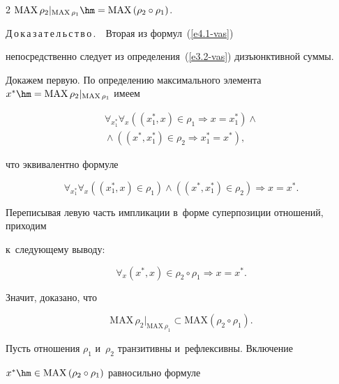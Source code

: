 \begin{multicols}{2}
 $\mathrm{MAX}\,\rho_2\vert_{\mathrm{MAX}\,\rho_1} \hm= \mathrm{MAX} \left(\rho_2\circ\rho_1\right)$.

 

 \smallskip

 

 \noindent

    Д\,о\,к\,а\,з\,а\,т\,е\,л\,ь\,с\,т\,в\,о\,.\ \ Вторая из формул~(\ref{e4.1-vas}) 

непосредственно следует из определения~(\ref{e3.2-vas}) дизъ\-юнк\-тив\-ной суммы. 

Докажем пер\-вую. По определению максимального элемента $x^*\hm= \mathrm{MAX}\,\rho_2\vert_{\mathrm{MAX}\,\rho_1}$ \mbox{имеем}

    \begin{multline*}

    \forall_{x_1^*} \forall_x \left( \left( x_1^*,x\right)\in\rho_1 \Rightarrow 

x=x_1^*\right) \wedge{}\\

{}\wedge  \left(\left( x^*,x_1^*\right)\in\rho_2\Rightarrow x_1^*=x^*\right),

 \end{multline*}

что эквивалентно формуле 

$$

\forall_{x_1^*} \forall_x \left(\left( x_1^*, x\right)\in \rho_1\right) \wedge \left(\left( x^*, 

x_1^*\right)\in \rho_2\right) \Rightarrow x=x^*.

$$

Переписывая левую часть импликации в~форме суперпозиции отношений, приходим 

к~сле\-ду\-юще\-му вы\-воду: 

$$

\forall_x \left( x^*, x\right) \in \rho_2\circ\rho_1\Rightarrow x=x^*.

$$

 Значит, доказано, что 

$$

\mathrm{MAX}\,\rho_2\vert_{\mathrm{MAX}\,\rho_1} \subset \mathrm{MAX} \left(\rho_2\circ\rho_1\right).

$$

    

    Пусть отношения $\rho_1$ и~$\rho_2$ транзитивны и~рефлексивны. Включение 

$x^*\hm\in \mathrm{MAX}\,(\rho_2\circ\rho_1)$ рав\-но\-силь\-но фор\-муле 


\end{multicols}
